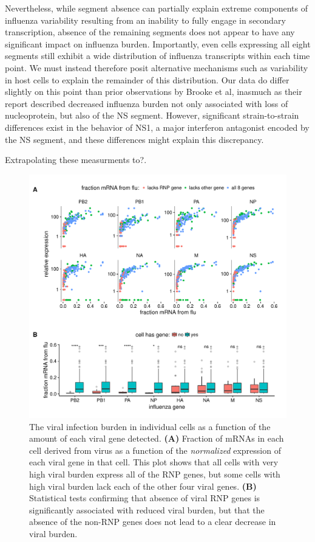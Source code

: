 \documentclass[9pt,lineno]{elife}
\begin{document}
	Nevertheless, while segment absence can partially explain extreme components of influenza variability resulting from an inability to fully engage in secondary transcription, absence of the remaining segments does not appear to have any significant impact on influenza burden. Importantly, even cells expressing all eight segments still exhibit a wide distribution of influenza transcripts within each time point. We must instead therefore posit alternative mechanisms such as variability in host cells to explain the remainder of this distribution.  Our data do differ slightly on this point than prior observations by Brooke et al, inasmuch as their report described decreased influenza burden not only associated with loss of nucleoprotein, but also of the NS segment. However, significant strain-to-strain differences exist in the behavior of NS1, a major interferon antagonist encoded by the NS segment, and these differences might explain this discrepancy. 



Extrapolating these measurments to?.

\begin{figure}
\includegraphics[width=\linewidth]{figures/p_flu_burden_flu_gene_merge.pdf}
\caption{
The viral infection burden in individual cells as a function of the amount of each viral gene detected.
{\bf (A)} 
Fraction of mRNAs in each cell derived from virus as a function of the \emph{normalized} expression of each viral gene in that cell.
This plot shows that all cells with very high viral burden express all of the RNP genes, but some cells with high viral burden lack each of the other four viral genes.
{\bf (B)}
Statistical tests confirming that absence of viral RNP genes is significantly associated with reduced viral burden, but that the absence of the non-RNP genes does not lead to a clear decrease in viral burden.
}
\label{fig:fluburdenbyflugene}
\end{figure}
\end{document}
